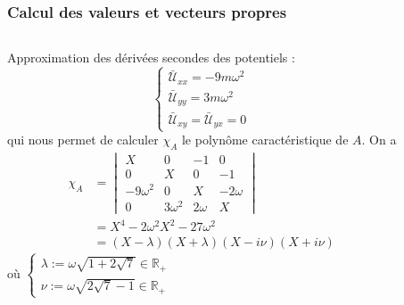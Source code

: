 \documentclass{beamer}
\begin{document}
	
	\begin{frame}
		\frametitle{Calcul des valeurs et vecteurs propres}{\scriptsize
		\begin{columns}[T]
			Approximation des dérivées secondes des potentiels :
			\begin{equation*}
				\begin{cases}
					\bar{\mathcal{U}}_{xx} = -9m\omega^2
					\\
					\bar{\mathcal{U}}_{yy} = 3m\omega^2
					\\
					\bar{\mathcal{U}}_{xy} = \bar{\mathcal{U}}_{yx} = 0
				\end{cases}
			\end{equation*}
			qui nous permet de calculer $\chi_A$ le polynôme caractéristique de $A$. On a
			\begin{align*}
			\chi_A &= \begin{vmatrix}
				X & 0 & -1 & 0 
				\\
				0 & X & 0 & -1
				\\
				-9\omega^2 & 0 & X & - 2 \omega
				\\
				0 & 3\omega^2 & 2\omega & X
			\end{vmatrix} \\
			&= X^4 -2\omega^2X^2 - 27\omega^2 \\
			&= (X-\lambda)(X+\lambda)(X-i\nu)(X+i\nu)
			\end{align*}
			où $\begin{cases}
				\lambda := \omega\sqrt{1+2\sqrt{7}} \in \mathbb{R}_+ \\
				\nu := \omega\sqrt{2\sqrt{7}-1} \in \mathbb{R}_+
			\end{cases}$
			
			\centering
			\textcolor{gray!40}{\rule{0.2pt}{1\textheight}}
			

\end{columns}}
\end{frame}
\end{document}
